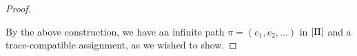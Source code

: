 \begin{proof}
\begin{enumerate}
\begin{enumerate}
\begin{enumerate}
  \end{enumerate}
 \end{enumerate}
\end{enumerate}

By the above construction, we have an infinite path $\pi = (e_1,e_2,\ldots)$ in ${|\Pi|}$
and a trace-compatible assignment, as we wished to show.

\end{proof}



%

